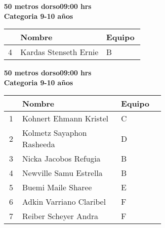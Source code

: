 \begin{minipage}{0.95\linewidth}\vspace{0.5cm} 
\begin{flushleft}
\textbf{
\hspace{-0.15cm}50 metros dorso\hspace{1.5cm}09:00 hrs \\Categoria 9-10 años}\vspace{-0.2cm} 
\end{flushleft}
\begin{tabular}{cp{0.63\linewidth}l}
\hline
& \textbf{Nombre} & \textbf{Equipo} \\ \hline
4 & Kardas Stenseth Ernie & B \\ 
\end{tabular}
\end{minipage}
\begin{minipage}{0.95\linewidth}\vspace{0.5cm} 
\begin{flushleft}
\textbf{
\hspace{-0.15cm}50 metros dorso\hspace{1.5cm}09:00 hrs \\Categoria 9-10 años}\vspace{-0.2cm} 
\end{flushleft}
\begin{tabular}{cp{0.63\linewidth}l}
\hline
& \textbf{Nombre} & \textbf{Equipo} \\ \hline
1 & Kohnert Ehmann Kristel & C \\ 
2 & Kolmetz Sayaphon Rasheeda & D \\ 
3 & Nicka Jacobos Refugia & B \\ 
4 & Newville Samu Estrella & B \\ 
5 & Buemi Maile Sharee & E \\ 
6 & Adkin Varriano Claribel & F \\ 
7 & Reiber Scheyer Andra & F \\ 
\end{tabular}
\end{minipage}
